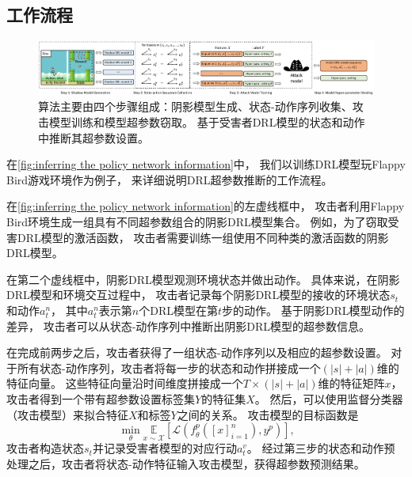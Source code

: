 \subsection{工作流程}
\label{sec:workflow}
\begin{figure}[!ht]
    \includegraphics[width=\hsize]{figure/drl_hypertheif/fig-overview-v3.pdf}
    \caption{\sysname 算法主要由四个步骤组成：阴影模型生成、状态-动作序列收集、攻击模型训练和模型超参数窃取。
    \sysname 基于受害者DRL模型的状态和动作中推断其超参数设置。
    }
    \label{fig:inferring the policy network information}
\end{figure}

在\autoref{fig:inferring the policy network information}中，
我们以训练DRL模型玩Flappy Bird游戏环境作为例子，
来详细说明DRL超参数推断的工作流程。

在\autoref{fig:inferring the policy network information}的左虚线框中，
攻击者利用Flappy Bird环境生成一组具有不同超参数组合的阴影DRL模型集合。
例如，为了窃取受害DRL模型的激活函数，
攻击者需要训练一组使用不同种类的激活函数的阴影DRL模型。

在第二个虚线框中，阴影DRL模型观测环境状态并做出动作。
具体来说，在阴影DRL模型和环境交互过程中，
攻击者记录每个阴影DRL模型的接收的环境状态$s_t$和动作$a^{n}_{t}$，
其中$a^{n}_{t}$表示第$n$个DRL模型在第$t$步的动作。
基于阴影DRL模型动作的差异，
攻击者可以从状态-动作序列中推断出阴影DRL模型的超参数信息。

在完成前两步之后，攻击者获得了一组状态-动作序列以及相应的超参数设置。
对于所有状态-动作序列，攻击者将每一步的状态和动作拼接成一个$(|s|+|a|)$维的特征向量。
这些特征向量沿时间维度拼接成一个$T \times (|s|+|a|)$维的特征矩阵$x$，攻击者得到一个带有超参数设置标签集$Y$的特征集$X$。
然后，可以使用监督分类器（攻击模型）来拟合特征$X$和标签$Y$之间的关系。
攻击模型的目标函数是
\begin{equation}
    \min _{\theta} \underset{x \sim \mathcal{X}}{\mathbb{E}}\left[
        \mathcal{L}\left(f_{\theta}^{p}\left(\left[x\right]_{i=1}^{n}\right), y^{p}\right)\right]\text{,}  
\end{equation}
攻击者构造状态$s_t$并记录受害者模型的对应行动$a^{v}_t$。
经过第三步的状态和动作预处理之后，攻击者将状态-动作特征输入攻击模型，获得超参数预测结果。

